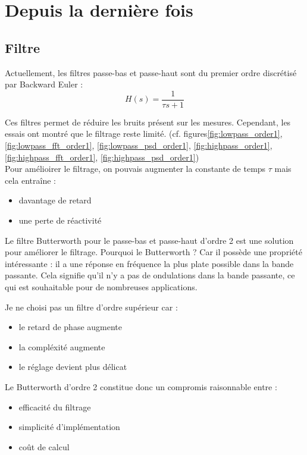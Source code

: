 \documentclass{article}
\begin{document}
\section{Depuis la dernière fois}

\subsection{Filtre}

Actuellement, les filtres passe-bas et passe-haut sont du premier ordre discrétisé par Backward Euler :
$$H(s) = \frac{1}{\tau s + 1}$$

Ces filtres permet de réduire les bruits présent sur les mesures. Cependant, les essais ont montré que le filtrage reste limité.
(cf. figures\ref{fig:lowpass_order1}, \ref{fig:lowpass_fft_order1}, \ref{fig:lowpass_psd_order1}, \ref{fig:highpass_order1}, \ref{fig:highpass_fft_order1}, \ref{fig:highpass_psd_order1}) \\
Pour amélioirer le filtrage, on pouvais augmenter la constante de temps $\tau$ mais cela entraîne :
\begin{itemize}
    \item davantage de retard
    \item une perte de réactivité
\end{itemize}

Le filtre Butterworth pour le passe-bas et passe-haut d'ordre 2 est une solution pour améliorer le filtrage.
Pourquoi le Butterworth ? Car il possède une propriété intéressante : il a une réponse en fréquence la plus plate possible dans la bande passante. Cela signifie qu'il n'y a pas de ondulations dans la bande passante, ce qui est souhaitable pour de nombreuses applications.

Je ne choisi pas un filtre d'ordre supérieur car :
\begin{itemize}
    \item le retard de phase augmente
    \item la compléxité augmente
    \item le réglage devient plus délicat
\end{itemize}

Le Butterworth d'ordre 2 constitue donc un compromis raisonnable entre :
\begin{itemize}
    \item efficacité du filtrage
    \item simplicité d'implémentation
    \item coût de calcul
\end{itemize}
\end{document}
